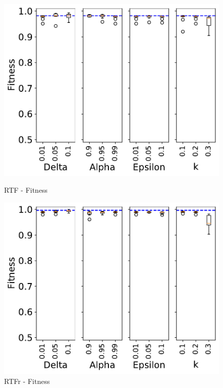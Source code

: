 \documentclass[landscape]{article}
\begin{document}
\begin{figure}[!htb]
	\begin{minipage}{0.2\textwidth}
		\includegraphics[width=1.0\textwidth]{../Road_Traffic_Fines_Management_Process/Road_Traffic_Fines_Management_Process_param_fitness_Approx_k02.pdf}
		\caption{RTF - Fitness}
	\end{minipage}
	\hfill
	\begin{minipage}{0.2\textwidth}
		\includegraphics[width=1.0\textwidth]{../RTFM_model2/RTFM_model2_param_fitness_Approx_k02.pdf}
		\caption{RTFr - Fitness}
	\end{minipage}
\end{figure}
	
\end{document}
